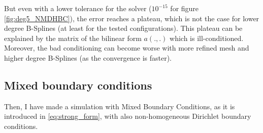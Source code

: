 \documentclass[a4paper,12pt,twoside]{report}
\begin{document}
But even with a lower tolerance for the solver ($10^{-15}$ for figure \ref{fig:deg5_NMDHBC}), the error reaches a plateau, which is not the case for lower degree B-Splines (at least for the tested configurations). This plateau can be explained by the matrix of the bilinear form $a(.,.)$ which is ill-conditioned. Moreover, the bad conditioning can become worse with more refined mesh and higher degree B-Splines (as the convergence is faster).

\subsection{Mixed boundary conditions}

Then, I have made a simulation with Mixed Boundary Conditions, as it is introduced in \eqref{eq:strong_form}, with also non-homogeneous Dirichlet boundary conditions.
\end{document}

